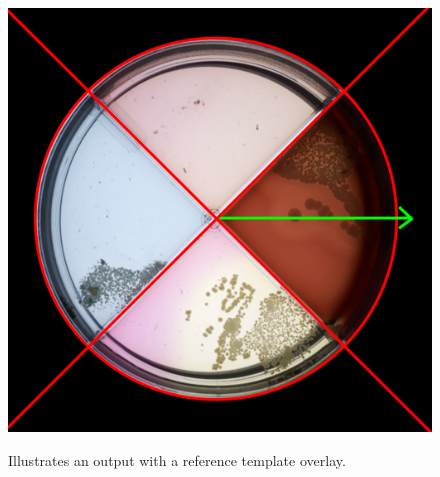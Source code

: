 \begin{figure}[htb]
    \centering
    \includegraphics[width=0.4\linewidth]{figures/PDF/Evaluation_2.pdf}\\
    \caption{Illustrates an output with a reference template overlay.}
    \label{fig:method evaluation}
\end{figure}


